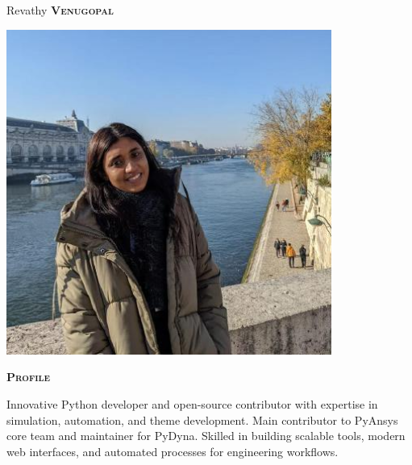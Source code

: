 \documentclass[11pt, a4paper]{article}
\newcommand{\headleft}[1]{\vspace*{3ex}\textsc{\textbf{#1}}\par%
    \vspace*{-1.5ex}\hrulefill\par\vspace*{0.7ex}}
\begin{document}
\setlength{\topskip}{0pt}
\setlength{\parindent}{0pt}
\setlength{\parskip}{0pt}
\setlength{\fboxsep}{0pt}
\pagestyle{empty}
\raggedbottom

\begin{minipage}[t]{0.33\textwidth} %
\colorbox{cvblue}{\begin{minipage}[t][5mm][t]{\textwidth}\null\hfill\null\end{minipage}}

\vspace{-.2ex} %
\colorbox{cvblue!90}{\color{white}  %
\textwidth\relax%
\begin{minipage}[t][293mm][t]{0.82\textwidth}
\raggedright
\vspace*{2.5ex}

\Large Revathy \textbf{\textsc{Venugopal}} \normalsize 

\null\hfill\includegraphics[width=0.80\textwidth]{image.jpeg}\hfill\null

\vspace*{0.5ex} %

\headleft{Profile}
Innovative Python developer and open-source contributor with expertise in simulation, automation, and theme development. Main contributor to PyAnsys core team and maintainer for PyDyna. Skilled in building scalable tools, modern web interfaces, and automated processes for engineering workflows.


\end{minipage}}
\end{minipage}
\end{document}

